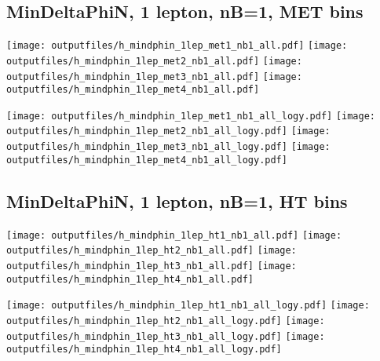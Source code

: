 \documentclass[11pt]{article}
\begin{document}
    \subsection{ MinDeltaPhiN, 1 lepton, nB=1, MET bins }

    \noindent
     \texttt{[image: outputfiles/h\_mindphin\_1lep\_met1\_nb1\_all.pdf]}
     \texttt{[image: outputfiles/h\_mindphin\_1lep\_met2\_nb1\_all.pdf]}
     \texttt{[image: outputfiles/h\_mindphin\_1lep\_met3\_nb1\_all.pdf]}
     \texttt{[image: outputfiles/h\_mindphin\_1lep\_met4\_nb1\_all.pdf]}

    \noindent
     \texttt{[image: outputfiles/h\_mindphin\_1lep\_met1\_nb1\_all\_logy.pdf]}
     \texttt{[image: outputfiles/h\_mindphin\_1lep\_met2\_nb1\_all\_logy.pdf]}
     \texttt{[image: outputfiles/h\_mindphin\_1lep\_met3\_nb1\_all\_logy.pdf]}
     \texttt{[image: outputfiles/h\_mindphin\_1lep\_met4\_nb1\_all\_logy.pdf]}

    \clearpage






    \subsection{ MinDeltaPhiN, 1 lepton, nB=1, HT bins }

    \noindent
     \texttt{[image: outputfiles/h\_mindphin\_1lep\_ht1\_nb1\_all.pdf]}
     \texttt{[image: outputfiles/h\_mindphin\_1lep\_ht2\_nb1\_all.pdf]}
     \texttt{[image: outputfiles/h\_mindphin\_1lep\_ht3\_nb1\_all.pdf]}
     \texttt{[image: outputfiles/h\_mindphin\_1lep\_ht4\_nb1\_all.pdf]}

    \noindent
     \texttt{[image: outputfiles/h\_mindphin\_1lep\_ht1\_nb1\_all\_logy.pdf]}
     \texttt{[image: outputfiles/h\_mindphin\_1lep\_ht2\_nb1\_all\_logy.pdf]}
     \texttt{[image: outputfiles/h\_mindphin\_1lep\_ht3\_nb1\_all\_logy.pdf]}
     \texttt{[image: outputfiles/h\_mindphin\_1lep\_ht4\_nb1\_all\_logy.pdf]}

    \clearpage
\end{document}
